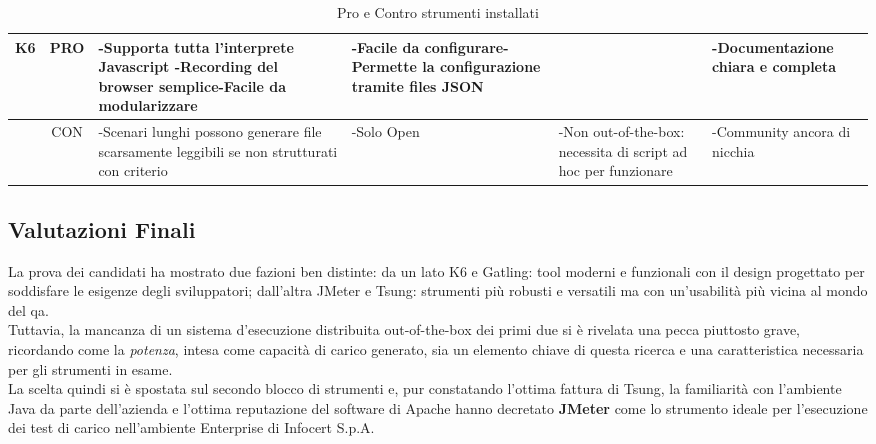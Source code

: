 \begin{table}[H]
\begin{center}
\begin{tabular}{|c|c|p{3cm}|p{3cm}|p{3cm}|p{3cm}|}
		\textbf{K6} & PRO & -Supporta tutta l'interprete Javascript \newline-Recording del browser semplice\newline-Facile da modularizzare & -Facile da configurare\newline-Permette la configurazione tramite files JSON &  & -Documentazione chiara e completa \\ \hline
		& CON & -Scenari lunghi possono generare file scarsamente leggibili se non strutturati con criterio & -Solo Open & -Non \gls{out-of-the-box}: necessita di script ad hoc per funzionare & -Community ancora di nicchia   \\ \hline
	\end{tabular}
\end{center}
\caption{Pro e Contro strumenti installati}
\end{table}
\endgroup
\subsection{Valutazioni Finali}
La prova dei candidati ha mostrato due fazioni ben distinte: da un lato K6 e Gatling: tool moderni e funzionali con il design progettato per soddisfare le esigenze degli sviluppatori; dall'altra JMeter e Tsung: strumenti più robusti e versatili ma con un'usabilità più vicina al mondo del \gls{qa}. \\
Tuttavia, la mancanza di un sistema d'esecuzione distribuita \gls{out-of-the-box} dei primi due si è rivelata una pecca piuttosto grave, ricordando come la \textit{potenza}, intesa come capacità di carico generato, sia un elemento chiave di questa ricerca e una caratteristica necessaria per gli strumenti in esame. \\
La scelta quindi si è spostata sul secondo blocco di strumenti e, pur constatando l'ottima fattura di Tsung, la familiarità con l'ambiente Java da parte dell'azienda e l'ottima reputazione del software di Apache hanno decretato \textbf{JMeter} come lo strumento ideale per l'esecuzione dei test di carico nell'ambiente Enterprise di Infocert S.p.A.